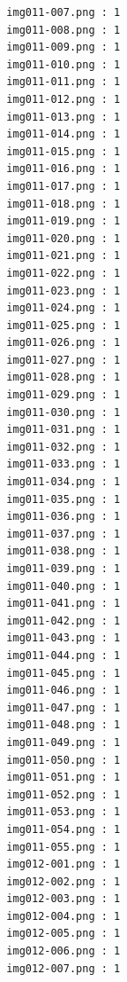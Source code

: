 \documentclass[12pt,a4paper]{article}
\begin{document}
\begin{lstlisting}
                     img011-007.png : 1
                     img011-008.png : 1
                     img011-009.png : 1
                     img011-010.png : 1
                     img011-011.png : 1
                     img011-012.png : 1
                     img011-013.png : 1
                     img011-014.png : 1
                     img011-015.png : 1
                     img011-016.png : 1
                     img011-017.png : 1
                     img011-018.png : 1
                     img011-019.png : 1
                     img011-020.png : 1
                     img011-021.png : 1
                     img011-022.png : 1
                     img011-023.png : 1
                     img011-024.png : 1
                     img011-025.png : 1
                     img011-026.png : 1
                     img011-027.png : 1
                     img011-028.png : 1
                     img011-029.png : 1
                     img011-030.png : 1
                     img011-031.png : 1
                     img011-032.png : 1
                     img011-033.png : 1
                     img011-034.png : 1
                     img011-035.png : 1
                     img011-036.png : 1
                     img011-037.png : 1
                     img011-038.png : 1
                     img011-039.png : 1
                     img011-040.png : 1
                     img011-041.png : 1
                     img011-042.png : 1
                     img011-043.png : 1
                     img011-044.png : 1
                     img011-045.png : 1
                     img011-046.png : 1
                     img011-047.png : 1
                     img011-048.png : 1
                     img011-049.png : 1
                     img011-050.png : 1
                     img011-051.png : 1
                     img011-052.png : 1
                     img011-053.png : 1
                     img011-054.png : 1
                     img011-055.png : 1
                     img012-001.png : 1
                     img012-002.png : 1
                     img012-003.png : 1
                     img012-004.png : 1
                     img012-005.png : 1
                     img012-006.png : 1
                     img012-007.png : 1




\end{lstlisting}
\end{document}
